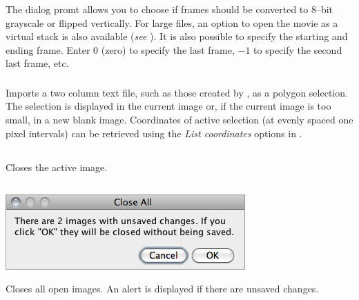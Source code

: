 The dialog promt allows you to choose if frames should be converted
to 8--bit grayscale or flipped vertically. For large files, an option
to open the movie as a virtual stack is also available (\emph{see}
). It is also possible to specify the
starting and ending frame. Enter $0$ (zero) to specify the last frame,
$-1$ to specify the second last frame, etc.




\subsubsection[\protect\userinterface{XY Coordinates\ldots{}}]{\protect{}\label{sub:Import>XYcoordinates...}}

Imports a two column text file, such as those created by ,
as a polygon selection. The selection is displayed in the current
image or, if the current image is too small, in a new blank image.
Coordinates of active selection (at evenly spaced one pixel intervals)
can be retrieved using the \emph{List coordinates} options in .


\subsection{\protect{}\label{sub:Close[w]}}

Closes the active image.


\subsection{\protect{}\label{sub:Close-All}}

\begin{minipage}[c][1\totalheight][t]{0.48\columnwidth}%
\includegraphics[scale=0.55]{images/Close-All}%
\end{minipage}%
\begin{minipage}[c][1\totalheight][t]{0.52\columnwidth}%
Closes all open images. An alert is displayed if there are unsaved
changes.%
\end{minipage}


